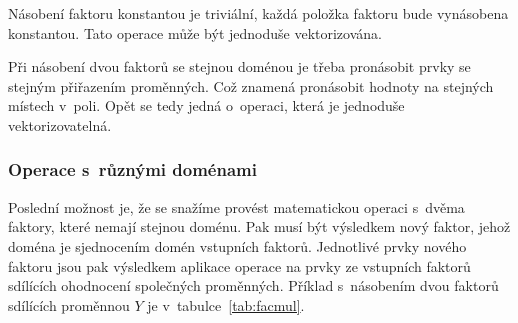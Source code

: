 Násobení faktoru konstantou je triviální, každá položka faktoru bude vynásobena konstantou.
Tato operace může být jednoduše vektorizována.

Při násobení dvou faktorů se stejnou doménou je třeba pronásobit prvky se stejným přiřazením proměnných.
Což znamená pronásobit hodnoty na stejných místech v~poli.
Opět se tedy jedná o~operaci, která je jednoduše vektorizovatelná.

\subsubsection{Operace s~různými doménami}

Poslední možnost je, že se snažíme provést matematickou operaci s~dvěma faktory, které nemají stejnou doménu.
Pak musí být výsledkem  nový faktor, jehož doména je sjednocením domén vstupních faktorů.
Jednotlivé prvky nového faktoru jsou pak výsledkem aplikace operace na prvky ze vstupních faktorů sdílících ohodnocení společných proměnných. 
Příklad s~násobením dvou faktorů sdílících proměnnou $Y$ je v~tabulce~\ref{tab:facmul}.
